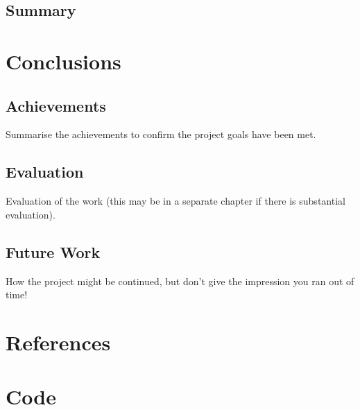 \documentclass[a4paper]{report}
\begin{document}
\section{Summary}

\chapter{Conclusions}

\section{Achievements}
Summarise the achievements to confirm the project goals have been met.
\section{Evaluation}
Evaluation of the work (this may be in a separate chapter if there is substantial evaluation).

\section{Future Work}
How the project might be continued, but don't give the impression you ran out of time!

\appendix

\chapter{References}

\chapter{Code}
\end{document}
